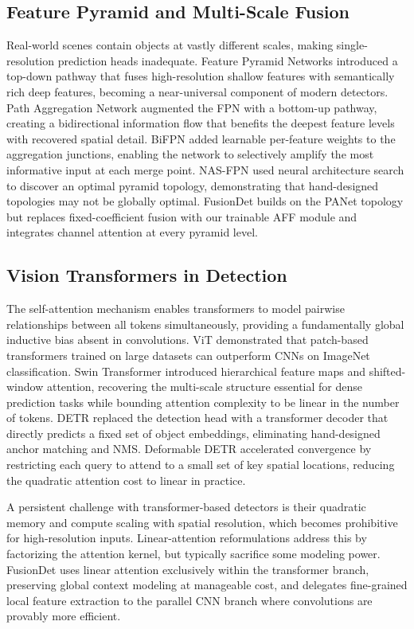 \subsection{Feature Pyramid and Multi-Scale Fusion}

Real-world scenes contain objects at vastly different scales, making
single-resolution prediction heads inadequate. Feature Pyramid
Networks \cite{lin2017feature} introduced a top-down pathway that
fuses high-resolution shallow features with semantically rich deep
features, becoming a near-universal component of modern detectors.
Path Aggregation Network \cite{liu2018path} augmented the FPN with a
bottom-up pathway, creating a bidirectional information flow that
benefits the deepest feature levels with recovered spatial detail.
BiFPN added learnable per-feature weights to the aggregation
junctions, enabling the network to selectively amplify the most
informative input at each merge point. NAS-FPN used neural
architecture search to discover an optimal pyramid topology,
demonstrating that hand-designed topologies may not be globally
optimal. FusionDet builds on the PANet topology but replaces
fixed-coefficient fusion with our trainable AFF module and
integrates channel attention at every pyramid level.

\subsection{Vision Transformers in Detection}

The self-attention mechanism \cite{vaswani2017attention} enables
transformers to model pairwise relationships between all tokens
simultaneously, providing a fundamentally global inductive bias
absent in convolutions. ViT \cite{dosovitskiy2021vit} demonstrated
that patch-based transformers trained on large datasets can
outperform CNNs on ImageNet classification. Swin Transformer
\cite{liu2021swin} introduced hierarchical feature maps and
shifted-window attention, recovering the multi-scale structure
essential for dense prediction tasks while bounding attention
complexity to be linear in the number of tokens. DETR
\cite{carion2020detr} replaced the detection head with a transformer
decoder that directly predicts a fixed set of object embeddings,
eliminating hand-designed anchor matching and NMS. Deformable DETR
accelerated convergence by restricting each query to attend to a
small set of key spatial locations, reducing the quadratic attention
cost to linear in practice.

A persistent challenge with transformer-based detectors is their
quadratic memory and compute scaling with spatial resolution, which
becomes prohibitive for high-resolution inputs. Linear-attention
reformulations \cite{katharopoulos2020transformers} address this by
factorizing the attention kernel, but typically sacrifice some
modeling power. FusionDet uses linear attention exclusively within
the transformer branch, preserving global context modeling at
manageable cost, and delegates fine-grained local feature extraction
to the parallel CNN branch where convolutions are provably more
efficient.

